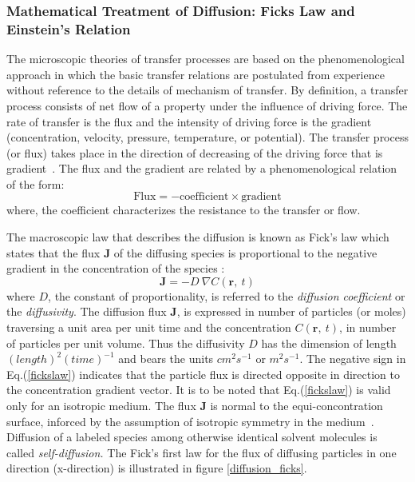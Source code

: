   \subsubsection{Mathematical Treatment of Diffusion: Ficks Law and Einstein's Relation}
 The microscopic theories of transfer processes are based on the phenomenological approach in which the basic transfer relations are postulated from experience without reference to the details of mechanism of transfer. By definition, a transfer process  consists of net flow of a property under the influence of driving force. The rate of transfer is the flux and the intensity of driving force is the  gradient (concentration, velocity, pressure, temperature, or potential). The transfer process (or flux) takes place in the direction of decreasing of the driving force that is gradient~\citep{bird2002}. The flux and the gradient are related by a phenomenological relation of the form:
    \begin{equation}
    \mathrm{Flux} = -\mathrm{coefficient} \times \mathrm{gradient}
    \end{equation}
    where, the coefficient characterizes the resistance to the transfer or flow.
    
  The macroscopic law that describes the diffusion is known as  Fick's law which states that the flux  $\mathbf{J}$ of the diffusing species is proportional to the negative gradient in the concentration of the species \citep{Frenkel2002}: 
     \begin{equation}
     \label{fickslaw}
     \mathbf{J} = -D ~\nabla C(\mathbf{r},~t)
     \end{equation}      	  						     	 	          
     where  $D$, the constant of proportionality, is referred to the \textit{diffusion coefficient} or the \emph{diffusivity}. The diffusion flux $\mathbf{J}$, is expressed in number of particles (or moles) traversing a unit area per unit time and the concentration $C(\mathbf{r},~t)$, in number of particles per unit volume. Thus the diffusivity $D$ has the dimension of length $(length)^ 2 (time)^{-1}$  and bears the units ${cm}^ 2 s^{-1}$ or $m^2 s^{-1}$. The negative sign in Eq.(\ref{fickslaw}) indicates that the particle flux is directed opposite in direction to the concentration gradient vector. It is to be noted  that Eq.(\ref{fickslaw}) is valid only for an isotropic medium. The flux $\textbf{J}$ is normal to the equi-concontration surface, inforced by the assumption of isotropic symmetry in the medium~\citep{crank1979}. Diffusion of a labeled species among otherwise identical solvent molecules is called \textit{self-diffusion.} The Fick's first law for the flux of diffusing particles in one direction (x-direction) is illustrated in figure \ref{diffusion_ficks}.
     
